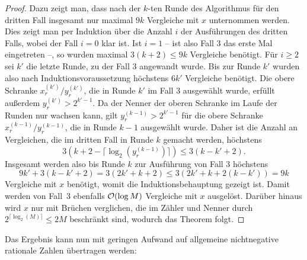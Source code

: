 \begin{proof}
 	Dazu zeigt man, dass nach der $k$-ten Runde des Algorithmus für den dritten Fall insgesamt nur maximal $9k$ Vergleiche mit $x$ unternommen werden.
 	Dies zeigt man per Induktion über die Anzahl $i$ der Ausführungen des dritten Falls, wobei der Fall $i=0$ klar ist.
 	Ist $i=1$ -- ist also Fall 3 das erste Mal eingetreten --, so wurden maximal $3(k+2) \leq 9k$ Vergleiche benötigt.
 	Für $i\geq2$ sei $k'$ die letzte Runde, zu der Fall 3 angewandt wurde.
 	Bis zur Runde $k'$ wurden also nach Induktionsvoraussetzung höchstens $6k'$ Vergleiche benötigt.
 	Die obere Schranke $x_r^{(k')} / y_r^{(k')}$, die in Runde $k'$ im Fall $3$ ausgewählt wurde, erfüllt außerdem $y_r^{(k')} > 2^{k'-1}$.
 	Da der Nenner der oberen Schranke im Laufe der Runden nur wachsen kann, gilt $y_r^{(k - 1)} > 2^{k'-1}$ für die obere Schranke $x_r^{(k-1)}/y_r^{(k-1)}$, die in Runde $k-1$ ausgewählt wurde.
 	Daher ist die Anzahl an Vergleichen, die im dritten Fall in Runde $k$ gemacht werden, höchstens \[
 	3(k+2-\lceil \log_2(y_r^{(k - 1)})\rceil )\leq 3(k - k' + 2).
 	\]
 	Insgesamt werden also bis Runde $k$ zur Ausführung von Fall 3 höchstens \[
 	9k' + 3(k-k'+2) = 3(2k' + k + 2) \leq 3(2k' + k + 2(k-k')) = 9 k
 	\]
 	Vergleiche mit $x$ benötigt, womit die Induktionsbehauptung gezeigt ist.
 	Damit werden von Fall~3 ebenfalls $\mathcal{O}(\log M)$ Vergleiche mit $x$ ausgelöst.
 	Darüber hinaus wird $x$ nur mit Brüchen verglichen, die im Zähler und Nenner durch $2^{\lceil \log_2(M) \rceil}\leq 2M$ beschränkt sind, wodurch das Theorem folgt.
 \end{proof}

Das Ergebnis kann nun mit geringen Aufwand auf allgemeine nichtnegative rationale Zahlen übertragen werden:

